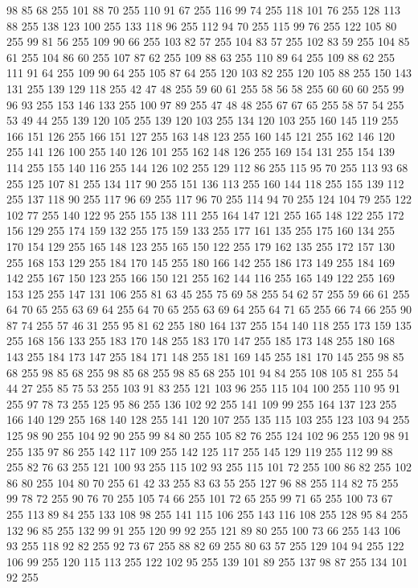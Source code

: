 98 85 68 255 101 88 70 255 110 91 67 255 116 99 74 255 118 101 76 255 128 113 88 255 138 123 100 255 133 118 96 255 112 94 70 255 115 99 76 255 122 105 80 255 99 81 56 255 109 90 66 255 103 82 57 255 104 83 57 255 102 83 59 255 104 85 61 255 104 86 60 255 107 87 62 255 109 88 63 255 110 89 64 255 109 88 62 255 111 91 64 255 109 90 64 255 105 87 64 255 120 103 82 255 120 105 88 255 150 143 131 255 139 129 118 255 42 47 48 255 59 60 61 255 58 56 58 255 60 60 60 255 99 96 93 255 153 146 133 255 100 97 89 255 47 48 48 255 67 67 65 255 58 57 54 255 53 49 44 255 139 120 105 255 139 120 103 255 134 120 103 255 160 145 119 255 166 151 126 255 166 151 127 255 163 148 123 255 160 145 121 255 162 146 120 255 141 126 100 255 140 126 101 255 162 148 126 255 169 154 131 255 154 139 114 255 155 140 116 255 144 126 102 255 129 112 86 255 115 95 70 255 113 93 68 255 125 107 81 255 134 117 90 255 151 136 113 255 160 144 118 255 155 139 112 255
137 118 90 255 117 96 69 255 117 96 70 255 114 94 70 255 124 104 79 255 122 102 77 255 140 122 95 255 155 138 111 255 164 147 121 255 165 148 122 255 172 156 129 255 174 159 132 255 175 159 133 255 177 161 135 255 175 160 134 255 170 154 129 255 165 148 123 255 165 150 122 255 179 162 135 255 172 157 130 255 168 153 129 255 184 170 145 255 180 166 142 255 186 173 149 255 184 169 142 255 167 150 123 255 166 150 121 255 162 144 116 255 165 149 122 255 169 153 125 255 147 131 106 255 81 63 45 255 75 69 58 255 54 62 57 255 59 66 61 255 64 70 65 255 63 69 64 255 64 70 65 255 63 69 64 255 64 71 65 255 66 74 66 255 90 87 74 255 57 46 31 255 95 81 62 255 180 164 137 255 154 140 118 255 173 159 135 255 168 156 133 255 183 170 148 255 183 170 147 255 185 173 148 255 180 168 143 255 184 173 147 255 184 171 148 255 181 169 145 255 181 170 145 255 98 85 68 255 98 85 68 255 98 85 68 255 98 85 68 255 101 94 84 255 108 105 81 255 54 44 27 255 85 75 53 255
103 91 83 255 121 103 96 255 115 104 100 255 110 95 91 255 97 78 73 255 125 95 86 255 136 102 92 255 141 109 99 255 164 137 123 255 166 140 129 255 168 140 128 255 141 120 107 255 135 115 103 255 123 103 94 255 125 98 90 255 104 92 90 255 99 84 80 255 105 82 76 255 124 102 96 255 120 98 91 255 135 97 86 255 142 117 109 255 142 125 117 255 145 129 119 255 112 99 88 255 82 76 63 255 121 100 93 255 115 102 93 255 115 101 72 255 100 86 82 255 102 86 80 255 104 80 70 255 61 42 33 255 83 63 55 255 127 96 88 255 114 82 75 255 99 78 72 255 90 76 70 255 105 74 66 255 101 72 65 255 99 71 65 255 100 73 67 255 113 89 84 255 133 108 98 255 141 115 106 255 143 116 108 255 128 95 84 255 132 96 85 255 132 99 91 255 120 99 92 255 121 89 80 255 100 73 66 255 143 106 93 255 118 92 82 255 92 73 67 255 88 82 69 255 80 63 57 255 129 104 94 255 122 106 99 255 120 115 113 255 122 102 95 255 139 101 89 255 137 98 87 255 134 101 92 255
